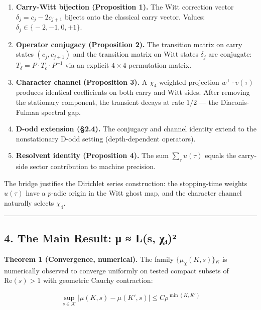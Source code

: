 \documentclass[
  11pt,
]{article}
\begin{document}
\begin{enumerate}
\def\labelenumi{\arabic{enumi}.}
\item
  \textbf{Carry-Witt bijection (Proposition 1).} The Witt correction vector
  \(\delta_j = c_j - 2c_{j+1}\) bijects onto the classical carry vector. Values:
  \(\delta_j \in \lbrace{}-2, -1, 0, +1\rbrace{}\).
\item
  \textbf{Operator conjugacy (Proposition 2).} The transition matrix on carry
  states \((c_j, c_{j+1})\) and the transition matrix on Witt states
  \(\delta_j\) are conjugate: \(T_\delta = P \cdot T_c \cdot P^{-1}\) via an
  explicit \(4 \times 4\) permutation matrix.
\item
  \textbf{Character channel (Proposition 3).} A \(\chi_4\)-weighted projection
  \(w^\top \cdot v(\tau)\) produces identical coefficients on both carry and
  Witt sides. After removing the stationary component, the transient decays at
  rate \(1/2\) --- the Diaconis-Fulman spectral gap.
\item
  \textbf{D-odd extension (§2.4).} The conjugacy and channel identity extend to
  the nonstationary D-odd setting (depth-dependent operators).
\item
  \textbf{Resolvent identity (Proposition 4).} The sum \(\sum_\tau u(\tau)\)
  equals the carry-side sector contribution to machine precision.
\end{enumerate}

The bridge justifies the Dirichlet series construction: the stopping-time
weights \(u(\tau)\) have a \(p\)-adic origin in the Witt ghost map, and the
character channel naturally selects \(\chi_4\).

\begin{center}\rule{0.5\linewidth}{0.5pt}\end{center}

\newpage

\subsection{4. The Main Result: μ ≈ L(s,
χ₄)²}\label{the-main-result-ux3bc-ls-ux3c7ux2084uxb2}

\textbf{Theorem 1 (Convergence, numerical).} The family
\(\lbrace{}\mu_{\chi}(K, s)\rbrace{}_K\) is numerically observed to converge
uniformly on tested compact subsets of \(\mathrm{Re}(s) > 1\) with geometric
Cauchy contraction:

\[\sup_{s \in \mathcal{K}} |\mu(K, s) - \mu(K', s)| \leq C \rho^{\min(K, K')}\]
\end{document}
